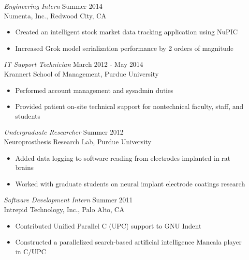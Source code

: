 \documentclass[margin,4pt]{res} %
\begin{document}
\begin{resume}
	
	{\sl Engineering Intern} \hfill Summer 2014\\
          Numenta, Inc., Redwood City, CA
		\begin{itemize} \itemsep -2pt
		\item Created an intelligent stock market data tracking application using NuPIC
		\item Increased Grok model serialization performance by 2 orders of magnitude
		\end{itemize}

	{\sl IT Support Technician} \hfill March 2012 - May 2014 \\
         	Krannert School of Management, Purdue University
		\begin{itemize} \itemsep -2pt
	      \item Performed account management and sysadmin duties 
           \item Provided patient on-site technical support for nontechnical faculty, staff, and students
		\end{itemize}

	{\sl Undergraduate Researcher} \hfill Summer 2012\\
          Neuroprosthesis Research Lab, Purdue University
	    	\begin{itemize} \itemsep -2pt
	    	\item Added data logging to software reading from electrodes implanted in rat brains
	    	\item Worked with graduate students on neural implant electrode coatings research
	    	\end{itemize}

	{\sl Software Development Intern} \hfill Summer 2011\\
          Intrepid Technology, Inc., Palo Alto, CA
          \begin{itemize}  \itemsep -2pt
		\item Contributed Unified Parallel C (UPC) support to GNU Indent
		\item Constructed a parallelized search-based artificial intelligence Mancala player in C/UPC
		\end{itemize}



\end{resume}
\end{document}
